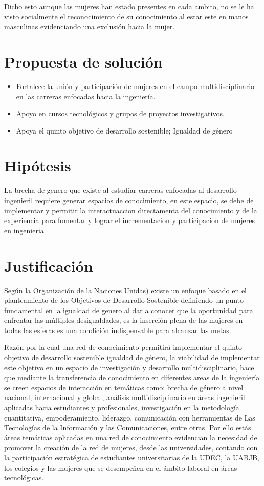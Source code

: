 \documentclass[hidelinks]{Documento}
\begin{document}
Dicho esto aunque las mujeres han estado presentes en cada ambito, no se le ha visto  socialmente el reconocimiento de su conocimiento al estar este en manos masculinas evidenciando una exclusión hacia la mujer.
\section{Propuesta de solución}

\begin{itemize}
    \item Fortalece la unión y participación de mujeres en el campo multidisciplinario en las carreras enfocadas hacia la ingeniería.
    \item Apoyo en cursos tecnológicos y grupos de proyectos investigativos.
    \item Apoya el quinto objetivo de desarrollo sostenible; Igualdad de género
\end{itemize}


\section{Hipótesis}

La brecha de genero que existe al estudiar carreras enfocadas al desarrollo ingenieril requiere generar espacios de conocimiento, en este espacio, se debe de implementar y permitir la interactuaccion directamenta del conocimiento y de la experiencia para fomentar y lograr el incrementacion y participacion de mujeres en ingenieria

\section{Justificación}

Según la Organización de la Naciones Unidas) existe un enfoque basado en el planteamiento de los  Objetivos de Desarrollo Sostenible definiendo un punto fundamental en la igualdad de genero al dar a conocer que la oportunidad para enfrentar las múltiples desigualdades, es la inserción plena de las mujeres en todas las esferas es una condición indispensable para alcanzar las metas. \cite{OrganizaciondelasNacionesUnidas2016}

Razón por la cual una red de conocimiento permitirá implementar el quinto objetivo de desarrollo sostenible igualdad de género, la viabilidad de implementar este objetivo en un espacio de investigación y desarrollo multidisciplinario, hace que mediante la transferencia de conocimiento en diferentes areas de la ingeniería se creen espacios de interacción en temáticas como: brecha de género a nivel nacional, internacional y global, análisis multidisciplinario en áreas ingenieril aplicadas hacia estudiantes y profesionales, investigación en la metodología cuantitativa, empoderamiento, liderazgo, comunicación con herramientas de Las Tecnologías de la Información y las Comunicaciones, entre otras. Por ello estás áreas temáticas aplicadas en una red de conocimiento evidencian la necesidad de promover la creación de la red de mujeres, desde las universidades, contando con la participación estratégica de estudiantes universitarias de la UDEC, la UABJB, los colegios y las mujeres que se desempeñen en el ámbito laboral en áreas tecnológicas.
\end{document}
